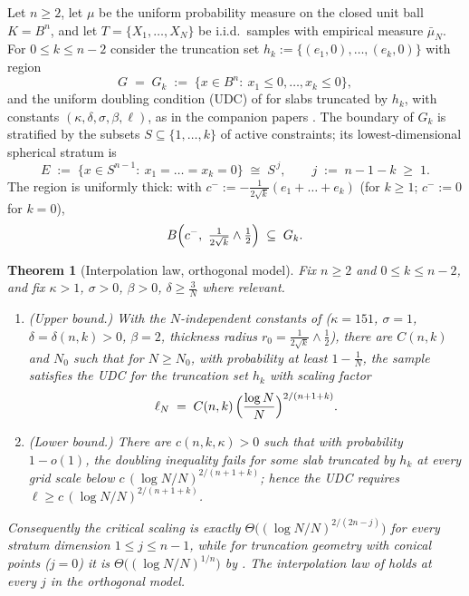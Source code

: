 ﻿\documentclass[11pt]{article}
\newtheorem{theorem}{Theorem}[section]
\newcommand{\emp}{\bar\mu_N}
\begin{document}
Let $n\ge2$, let $\mu$ be the uniform probability measure on the closed unit
ball $K=B^n$, and let $T=\{X_1,\dots,X_N\}$ be i.i.d.\ samples with empirical
measure $\emp$.  For $0\le k\le n-2$ consider the truncation set
$h_k:=\{(e_1,0),\dots,(e_k,0)\}$ with region
\[
G\;=\;G_k\;:=\;\bigl\{x\in B^n:\ x_1\le0,\dots,x_k\le0\bigr\},
\]
and the uniform doubling condition (UDC) of \cite{ShmaloUDC} for slabs
truncated by $h_k$, with constants $(\kappa,\delta,\sigma,\beta,\ell)$, as in
the companion papers \cite{companion2,companion3,companion4,companion5,
companion6,companion7}.  The boundary of $G_k$ is stratified by the subsets
$S\subseteq\{1,\dots,k\}$ of active constraints; its lowest-dimensional
spherical stratum is
\[
E\;:=\;\bigl\{x\in S^{n-1}:\ x_1=\dots=x_k=0\bigr\}\;\cong\;S^{\,j},
\qquad
j\;:=\;n-1-k\;\ge\;1 .
\]
The region is uniformly thick: with
$c^-:=-\frac1{2\sqrt k}(e_1+\dots+e_k)$ (for $k\ge1$; $c^-:=0$ for $k=0$),
\begin{equation}\label{eq:thick}
B\Bigl(c^-,\ \tfrac1{2\sqrt k}\wedge\tfrac12\Bigr)\;\subseteq\;G_k .
\end{equation}

\begin{theorem}[Interpolation law, orthogonal model]\label{thm:main}
Fix $n\ge2$ and $0\le k\le n-2$, and fix $\kappa>1$, $\sigma>0$, $\beta>0$,
$\delta\ge\frac3N$ where relevant.
\begin{enumerate}
\item[(i)] {\rm(Upper bound.)}  With the $N$-independent constants of
\cite{companion2} {\rm(}$\kappa=151$, $\sigma=1$, $\delta=\delta(n,k)>0$,
$\beta=2$, thickness radius $r_0=\frac1{2\sqrt k}\wedge\frac12${\rm)}, there
are $C(n,k)$ and $N_0$ such that for $N\ge N_0$, with probability at least
$1-\frac1N$, the sample satisfies the UDC for the truncation set $h_k$ with
scaling factor
\[
\ell_N\;=\;C(n,k)\,\Bigl(\frac{\log N}{N}\Bigr)^{2/(n+1+k)} .
\]
\item[(ii)] {\rm(Lower bound.)}  There are $c(n,k,\kappa)>0$ such that with
probability $1-o(1)$, the doubling inequality fails for some slab truncated by
$h_k$ at every grid scale below $c\,(\log N/N)^{2/(n+1+k)}$; hence the UDC
requires $\ell\ge c\,(\log N/N)^{2/(n+1+k)}$.
\end{enumerate}
Consequently the critical scaling is exactly
$\Theta\bigl((\log N/N)^{2/(2n-j)}\bigr)$ for every stratum dimension
$1\le j\le n-1$, while for truncation geometry with conical points
{\rm(}$j=0${\rm)} it is $\Theta\bigl((\log N/N)^{1/n}\bigr)$ by
\cite{companion3,companion5}.  The interpolation law of
\cite[Conjecture 1.2]{companion6} holds at every $j$ in the orthogonal model.
\end{theorem}
\end{document}
